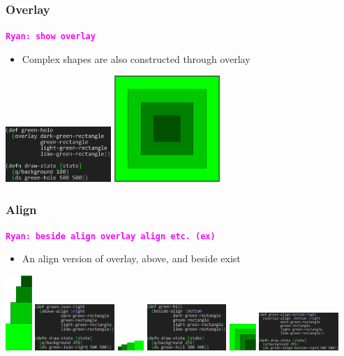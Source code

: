 \documentclass{beamer}
\newcommand{\comment}[1]{{\bf \tt  {#1}}}
\newcommand{\rmcomment}[1]{\textcolor{magenta}{\comment{Ryan: {#1}}}}
\begin{document}
\begin{frame}
\frametitle{Overlay}
\rmcomment{show overlay}
	\begin{itemize}
		\item Complex shapes are also constructed through overlay
	\end{itemize}
	\includegraphics[width=4cm]{PresentationImages/fcsGreenHoleCode.png}
	\includegraphics[width=4cm]{PresentationImages/greenHole.png}
\end{frame}

\begin{frame}
\frametitle{Align}
\rmcomment{beside align overlay align etc. (ex)}
	\begin{itemize}
		\item An align version of overlay, above, and beside exist
	\end{itemize}
	\includegraphics[width=1cm]{PresentationImages/greenLeanRight.png}
	\includegraphics[width=3cm]{PresentationImages/greenLeanRightCode.png}
	\includegraphics[width=1cm]{PresentationImages/greenSlopeBottom.png}
	\includegraphics[width=3cm]{PresentationImages/greenSlopeBottomCode.png}
	\includegraphics[width=1cm]{PresentationImages/greenAlignBottomRight.png}
	\includegraphics[width=3cm]{PresentationImages/greenAlignBottomRightCode.png}
\end{frame}
\end{document}
